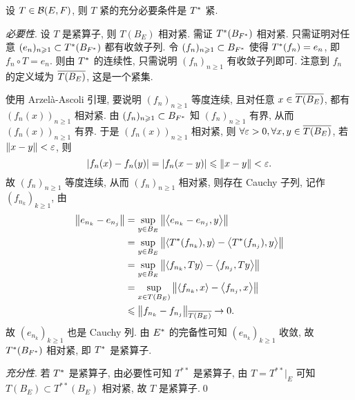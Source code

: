     \begin{Theorem}
        设 $ T\in\CB(E, F) $, 则 $ T $ 紧的充分必要条件是 $ \Star{T} $ 紧.
    \end{Theorem}
    \begin{Proof}
        \textsl{必要性}. 设 $ T $ 是紧算子, 则 $ T(B_{E}) $ 相对紧. 需证 $ \Star{T}(B_{\Star{F}}) $ 相对紧. 只需证明对任意 $ (e_{n})_{n\geqslant1}\subset \Star{T}(B_{\Star{F}}) $ 都有收敛子列. 令 $ (f_{n})_{n\geqslant1}\subset B_{\Star{F}} $ 使得 $ \Star{T}(f_{n})=e_{n} $, 即 $ f_{n}\circ T=e_{n} $. 则由 $ \Star{T} $ 的连续性, 只需说明 $ (f_{n})_{n\geqslant1} $ 有收敛子列即可. 注意到 $ f_{n} $ 的定义域为 $ \baro{T(B_{E})} $, 这是一个紧集.

        使用 Arzel\`a-Ascoli 引理, 要说明 $ (f_{n})_{n\geqslant1} $ 等度连续, 且对任意 $ x\in\baro{T(B_{E})} $, 都有 $ (f_{n}(x))_{n\geqslant1} $ 相对紧. 由 $ (f_{n})_{n\geqslant1}\subset B_{\Star{F}} $ 知 $ (f_{n})_{n\geqslant1} $ 有界, 从而 $ (f_{n}(x))_{n\geqslant1} $ 有界. 于是 $ (f_{n}(x))_{n\geqslant1} $ 相对紧, 则 $ \forall\varepsilon>0, \forall x, y\in\baro{T(B_{E})} $, 若 $ \norm{x-y}<\varepsilon $, 则
        \[
            \abs{f_{n}(x)-f_{n}(y)} = \abs{f_{n}(x-y)}\leqslant\norm{x-y}<\varepsilon.
        \] 
        故 $ (f_{n})_{n\geqslant1} $ 等度连续, 从而 $ (f_{n})_{n\geqslant1} $ 相对紧, 则存在 Cauchy 子列,
        记作 $ (f_{n_{k}})_{k\geqslant1} $, 由
        \[
            \begin{aligned}
                \norm{e_{n_{k}}-e_{n_{j}}} & = \sup_{y\in B_{E}}\norm{\lrangle{e_{n_{k}}-e_{n_{j}}, y}} \\
                & = \sup_{y\in B_{E}}\norm{\lrangle{\Star{T}(f_{n_{k}}), y}-\lrangle{\Star{T}(f_{n_{j}}), y}}\\
                & = \sup_{y\in B_{E}}\norm{\lrangle{f_{n_{k}}, Ty}-\lrangle{f_{n_{j}}, Ty}}\\
                & =  \sup_{x\in T(B_{E})}\norm{\lrangle{f_{n_{k}}, x}-\lrangle{f_{n_{j}}, x}}\\
                & \leqslant \norm{f_{n_{k}}-f_{n_{j}}}_{\baro{T(B_{E})}}\to 0.
            \end{aligned}
        \]
        故 $ (e_{n_{k}})_{k\geqslant1} $ 也是 Cauchy 列. 由 $ \Star{E} $ 的完备性可知 $ (e_{n_{k}})_{k\geqslant1} $ 收敛, 故 $ \Star{T}(B_{\Star{F}}) $ 相对紧, 即 $ \Star{T} $ 是紧算子.

        \textsl{充分性}. 若 $ \Star{T} $ 是紧算子, 由必要性可知 $ T^{**} $ 是紧算子, 由 $ T = T^{**}|_{E} $ 可知 $ T(B_{E})\subset T^{**}(B_{E}) $ 相对紧, 故 $ T $ 是紧算子.\qed
    \end{Proof}

